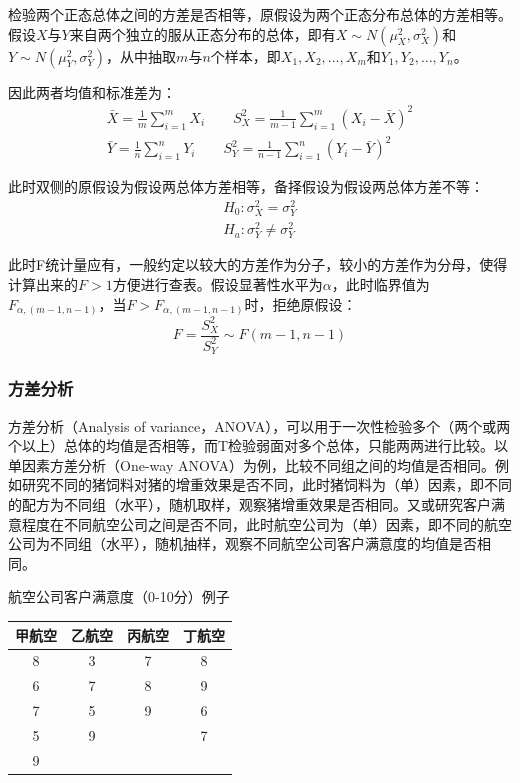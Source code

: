 \documentclass[11pt]{article}
\begin{document}
检验两个正态总体之间的方差是否相等，原假设为两个正态分布总体的方差相等。假设$X$与$Y$来自两个独立的服从正态分布的总体，即有$X\sim N(\mu_X^2,\sigma_X^2)$和$Y\sim N(\mu_Y^2,\sigma_Y^2)$，从中抽取$m$与$n$个样本，即$X_1,X_2,\dots,X_m$和$Y_1,Y_2,\dots,Y_n$。

因此两者均值和标准差为：
\begin{gather*}
    \bar{X} = \frac{1}{m} \sum_{i=1}^{m} X_i \qquad 
    S_X^2 = \frac{1}{m-1} \sum_{i=1}^{m} \left(X_i -\bar{X}\right)^2 \\
    \bar{Y} = \frac{1}{n} \sum_{i=1}^{n} Y_i \qquad
    S_Y^2 = \frac{1}{n-1} \sum_{i=1}^{n} \left(Y_i -\bar{Y}\right)^2
\end{gather*}

此时双侧的原假设为假设两总体方差相等，备择假设为假设两总体方差不等：
\begin{align*}
    H_0: \sigma_X^2 = \sigma_Y^2 \\
    H_a: \sigma_Y^2 \neq \sigma_Y^2
\end{align*}

此时F统计量应有，一般约定以较大的方差作为分子，较小的方差作为分母，使得计算出来的$F>1$方便进行查表。假设显著性水平为$\alpha$，此时临界值为$F_{\alpha,(m-1,n-1)}$，当$F>F_{\alpha,(m-1,n-1)}$时，拒绝原假设：
\begin{equation*}
    F = \frac{S_X^2}{S_Y^2} \sim F(m-1,n-1)
\end{equation*}

\subsubsection{方差分析}

方差分析（Analysis of variance，ANOVA），可以用于一次性检验多个（两个或两个以上）总体的均值是否相等，而T检验弱面对多个总体，只能两两进行比较。以单因素方差分析（One-way ANOVA）为例，比较不同组之间的均值是否相同。例如研究不同的猪饲料对猪的增重效果是否不同，此时猪饲料为（单）因素，即不同的配方为不同组（水平），随机取样，观察猪增重效果是否相同。又或研究客户满意程度在不同航空公司之间是否不同，此时航空公司为（单）因素，即不同的航空公司为不同组（水平），随机抽样，观察不同航空公司客户满意度的均值是否相同。
\begin{example}
    航空公司客户满意度（0-10分）例子

    \begin{table}[H]
    \centering
    \begin{tabular}{@{}cccc@{}}
    \toprule
    \textbf{甲航空} & \textbf{乙航空} & \textbf{丙航空} & \textbf{丁航空} \\ \midrule
    8 & 3 & 7 & 8 \\
    6 & 7 & 8 & 9 \\
    7 & 5 & 9 & 6 \\
    5 & 9 &   & 7 \\
    9 &   &   &   \\ \bottomrule
    \end{tabular}
    \end{table}
\end{example}
\end{document}
